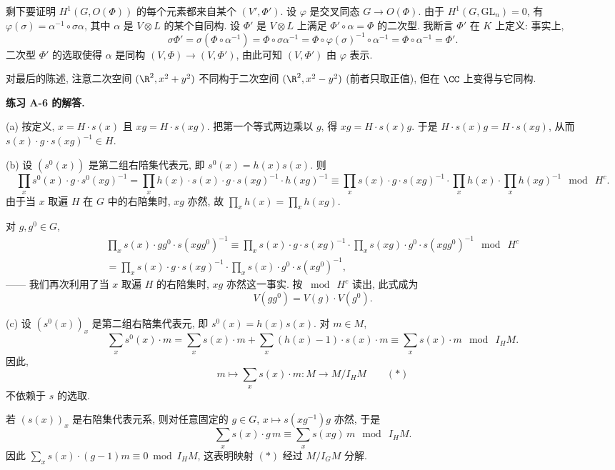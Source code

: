 剩下要证明 $H^{1}(G,O(\Phi))$ 的每个元素都来自某个 $(V',\Phi')$. 设 $\varphi$ 是交叉同态 $G\to O(\Phi)$. 由于 $H^{1}(G,\mathrm{GL}_n)=0$, 有 $\varphi(\sigma)=\alpha^{-1}\circ\sigma\alpha$, 其中 $\alpha$ 是 $V\otimes L$ 的某个自同构. 设 $\Phi'$ 是 $V\otimes L$ 上满足 $\Phi'\circ\alpha=\Phi$ 的二次型. 我断言 $\Phi'$ 在 $K$ 上定义: 事实上,
\[
\sigma\Phi'=\sigma(\Phi\circ\alpha^{-1})=\Phi\circ\sigma\alpha^{-1}=\Phi\circ\varphi(\sigma)^{-1}\circ\alpha^{-1}=\Phi\circ\alpha^{-1}=\Phi'.
\]
二次型 $\Phi'$ 的选取使得 $\alpha$ 是同构 $(V,\Phi)\to(V,\Phi')$, 由此可知 $(V,\Phi')$ 由 $\varphi$ 表示.

对最后的陈述, 注意二次空间 $(\R^{2},x^{2}+y^{2})$ 不同构于二次空间 $(\R^{2},x^{2}-y^{2})$ (前者只取正值), 但在 $\CC$ 上变得与它同构.

\noindent\textbf{练习 A-6 的解答.}

(a) 按定义, $x=H\cdot s(x)$ 且 $xg=H\cdot s(xg)$. 把第一个等式两边乘以 $g$, 得 $xg=H\cdot s(x)g$. 于是 $H\cdot s(x)g=H\cdot s(xg)$, 从而 $s(x)\cdot g\cdot s(xg)^{-1}\in H$.

(b) 设 $(s^{0}(x))$ 是第二组右陪集代表元, 即 $s^{0}(x)=h(x)s(x)$. 则
\[
\prod_x s^{0}(x)\cdot g\cdot s^{0}(xg)^{-1}
=\prod_x h(x)\cdot s(x)\cdot g\cdot s(xg)^{-1}\cdot h(xg)^{-1}
\equiv\prod_x s(x)\cdot g\cdot s(xg)^{-1}\cdot\prod_x h(x)\cdot\prod_x h(xg)^{-1}\ \bmod\ H^{c}.
\]
由于当 $x$ 取遍 $H$ 在 $G$ 中的右陪集时, $xg$ 亦然, 故 $\prod_x h(x)=\prod_x h(xg)$.

对 $g,g^{0}\in G$,
\begin{multline*}
\prod_x s(x)\cdot gg^{0}\cdot s(xgg^{0})^{-1}
\equiv\prod_x s(x)\cdot g\cdot s(xg)^{-1}\cdot\prod_x s(xg)\cdot g^{0}\cdot s(xgg^{0})^{-1}\ \bmod\ H^{c}\\
=\prod_x s(x)\cdot g\cdot s(xg)^{-1}\cdot\prod_x s(x)\cdot g^{0}\cdot s(xg^{0})^{-1},
\end{multline*}
—— 我们再次利用了当 $x$ 取遍 $H$ 的右陪集时, $xg$ 亦然这一事实. 按 $\bmod\ H^{c}$ 读出, 此式成为
\[
V(gg^{0})=V(g)\cdot V(g^{0}).
\]

(c) 设 $(s^{0}(x))_x$ 是第二组右陪集代表元, 即 $s^{0}(x)=h(x)s(x)$. 对 $m\in M$,
\[
\sum_x s^{0}(x)\cdot m=\sum_x s(x)\cdot m+\sum_x(h(x)-1)\cdot s(x)\cdot m\equiv\sum_x s(x)\cdot m\ \bmod\ I_H M.
\]
因此,
\[
m\mapsto\sum_x s(x)\cdot m\colon M\to M/I_H M\qquad(*)
\]
不依赖于 $s$ 的选取.

若 $(s(x))_x$ 是右陪集代表元系, 则对任意固定的 $g\in G$, $x\mapsto s(xg^{-1})g$ 亦然, 于是
\[
\sum_x s(x)\cdot g\, m\equiv\sum_x s(xg)\, m\ \bmod\ I_H M.
\]
因此 $\sum_x s(x)\cdot(g-1)m\equiv 0 \bmod I_H M$, 这表明映射 $(*)$ 经过 $M/I_G M$ 分解.

